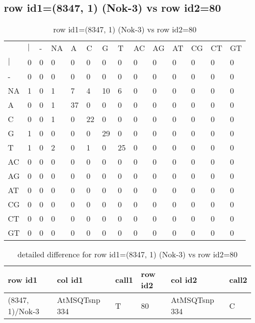 \subsection{row id1=(8347, 1) (Nok-3) vs row id2=80}
\begin{center}
\begin{longtable}{|l|l|l|l|l|l|l|l|l|l|l|l|l|l|}
\caption{row id1=(8347, 1) (Nok-3) vs row id2=80} \label{table_dm366}\\
\hline
\\
\hline
&$|$&-&NA&A&C&G&T&AC&AG&AT&CG&CT&GT\\
$|$&0&0&0&0&0&0&0&0&0&0&0&0&0\\
-&0&0&0&0&0&0&0&0&0&0&0&0&0\\
NA&1&0&1&7&4&10&6&0&0&0&0&0&0\\
A&0&0&1&37&0&0&0&0&0&0&0&0&0\\
C&0&0&1&0&22&0&0&0&0&0&0&0&0\\
G&1&0&0&0&0&29&0&0&0&0&0&0&0\\
T&1&0&2&0&1&0&25&0&0&0&0&0&0\\
AC&0&0&0&0&0&0&0&0&0&0&0&0&0\\
AG&0&0&0&0&0&0&0&0&0&0&0&0&0\\
AT&0&0&0&0&0&0&0&0&0&0&0&0&0\\
CG&0&0&0&0&0&0&0&0&0&0&0&0&0\\
CT&0&0&0&0&0&0&0&0&0&0&0&0&0\\
GT&0&0&0&0&0&0&0&0&0&0&0&0&0\\
\hline
\end{longtable}
\end{center}

\begin{center}
\begin{longtable}{|l|l|l|l|l|l|}
\caption{detailed difference for row id1=(8347, 1) (Nok-3) vs row id2=80} \label{table_dm367}\\
\hline
row id1&col id1&call1&row id2&col id2&call2\\
\hline
(8347, 1)/Nok-3&AtMSQTsnp 334&T&80&AtMSQTsnp 334&C\\
\hline
\end{longtable}
\end{center}

